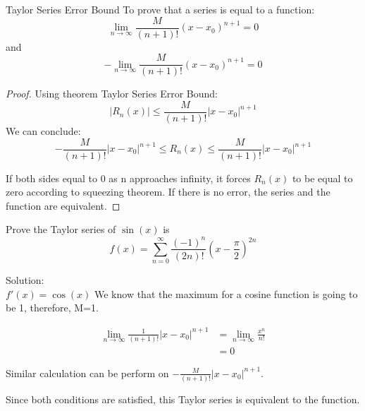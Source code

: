 	\begin{theorem}{Taylor Series Error Bound}{}
	    To prove that a series is equal to a function:
	    \begin{equation}
	        \lim_{n\to\infty}\frac{M}{(n+1)!}(x-x_0)^{n+1}=0
	    \end{equation}
	    and 
	    \begin{equation}
	        -\lim_{n\to\infty}\frac{M}{(n+1)!}(x-x_0)^{n+1}=0
	    \end{equation}
	\end{theorem}
	
	\begin{proof}
    Using theorem Taylor Series Error Bound:
    $$\left|R_n(x)\right|\leq \frac{M}{(n+1)!}|x-x_0|^{n+1}$$
    We can conclude:
    $$-\frac{M}{(n+1)!}|x-x_0|^{n+1}\leq R_n(x)\leq \frac{M}{(n+1)!}|x-x_0|^{n+1}$$
    
    \noindent If both sides equal to 0 as n approaches infinity, it forces $R_n(x)$ to be equal to zero according to squeezing theorem. If there is no error, the series and the function are equivalent. 
	\end{proof}
	
	\begin{simple}{}{}
	    Prove the Taylor series of $\sin{(x)}$ is 
	    $$f(x)=\sum^\infty_{n=0}\dfrac{(-1)^n}{(2n)!}\left(x-\dfrac{\pi}{2}\right)^{2n}$$
	    
	    Solution:\\
	    $f'(x)=\cos{(x)}$
	    We know that the maximum for a cosine function is going to be 1, therefore, M=1.
	    
	    \begin{align*}
	        \lim_{n\to\infty}\frac{1}{(n+1)!}|x-x_0|^{n+1}&=\lim_{n\to\infty}\frac{x^n}{n!}\\
	        &=0
	    \end{align*}
	    
	    Similar calculation can be perform on $-\frac{M}{(n+1)!}|x-x_0|^{n+1}$.
	    
	    Since both conditions are satisfied, this Taylor series is equivalent to the function.
	\end{simple}
	
	